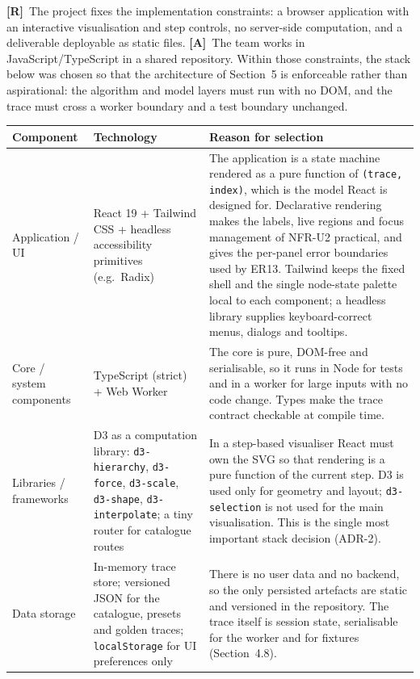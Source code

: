 \documentclass[11pt,a4paper]{article}
\newcommand{\R}{\textcolor{reqc}{\textbf{[R]}}}     %
\newcommand{\A}{\textcolor{asmc}{\textbf{[A]}}}     %
\newcommand{\ct}[1]{\texttt{#1}}
\begin{document}
\R\ The project fixes the implementation constraints: a browser application with an interactive
visualisation and step controls, no server-side computation, and a deliverable deployable as
static files. \A\ The team works in JavaScript/TypeScript in a shared repository. Within those
constraints, the stack below was chosen so that the architecture of Section~5 is enforceable
rather than aspirational: the algorithm and model layers must run with no DOM, and the trace must
cross a worker boundary and a test boundary unchanged.

\begin{table}[H]
\centering
\small
\setlength{\tabcolsep}{4pt}
\begin{tabular}{@{}L{3.0cm}L{3.6cm}L{8.4cm}@{}}
\toprule
\textbf{Component} & \textbf{Technology} & \textbf{Reason for selection} \\
\midrule
Application / UI & React 19 + Tailwind CSS + headless accessibility primitives (e.g.\ Radix) &
The application is a state machine rendered as a pure function of \ct{(trace, index)}, which is the
model React is designed for. Declarative rendering makes the labels, live regions and focus
management of NFR-U2 practical, and gives the per-panel error boundaries used by ER13. Tailwind
keeps the fixed shell and the single node-state palette local to each component; a headless
library supplies keyboard-correct menus, dialogs and tooltips. \\
Core / system components & TypeScript (strict) + Web Worker &
The core is pure, DOM-free and serialisable, so it runs in Node for tests and in a worker for large
inputs with no code change. Types make the trace contract checkable at compile time. \\
Libraries / frameworks & D3 as a computation library: \ct{d3-hierarchy}, \ct{d3-force},
\ct{d3-scale}, \ct{d3-shape}, \ct{d3-interpolate}; a tiny router for catalogue routes &
In a step-based visualiser React must own the SVG so that rendering is a pure function of the
current step. D3 is used only for geometry and layout; \ct{d3-selection} is not used for the main
visualisation. This is the single most important stack decision (ADR-2). \\
Data storage & In-memory trace store; versioned JSON for the catalogue, presets and golden traces;
\ct{localStorage} for UI preferences only &
There is no user data and no backend, so the only persisted artefacts are static and versioned in
the repository. The trace itself is session state, serialisable for the worker and for fixtures
(Section~4.8). \\

\end{tabular}
\end{table}
\end{document}
